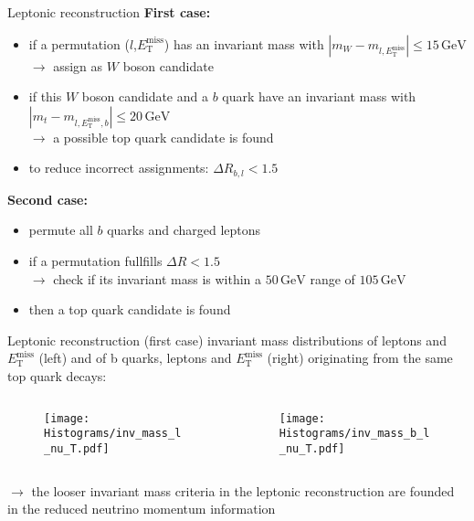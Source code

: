 \documentclass[aspectratio=1610, professionalfonts, 9pt]{beamer}
\begin{document}
\begin{frame}{Leptonic reconstruction}
  \textbf{First case:}
  \begin{itemize}
    \item if a permutation (\(l\),\(E_{\mathrm{T}}^\mathrm{{miss}}\)) has an invariant mass with \(|m_{W}-m_{l,E_{\mathrm{T}}^\mathrm{{miss}}}| \le 15\,\mathrm{GeV}\) \\
    \(\rightarrow\) assign as \(W\) boson candidate
    \item if this \(W\) boson candidate and a \(b\) quark have an invariant mass with \(|m_{t}-m_{l,E_{\mathrm{T}}^\mathrm{{miss}},b}| \le 20\,\mathrm{GeV}\) \\
    \(\rightarrow\) a possible top quark candidate is found
    \item to reduce incorrect assignments: \(\Delta R_{b,l} < 1.5\)
  \end{itemize}
  \vspace{3mm}
  \textbf{Second case:}
  \begin{itemize}
    \item permute all \(b\) quarks and charged leptons
    \item if a permutation fullfills \(\Delta R < 1.5\) \\
    \(\rightarrow\) check if its invariant mass is within a \(50 \, \mathrm{GeV}\) range of \(105 \, \mathrm{GeV}\)
    \item then a top quark candidate is found
  \end{itemize}
\end{frame}

\begin{frame}{Leptonic reconstruction (first case)}
  invariant mass distributions of leptons and \(E_{\mathrm{T}}^\mathrm{{miss}}\) (left) and of b quarks,
  leptons and \(E_{\mathrm{T}}^\mathrm{{miss}}\) (right) originating from the same top quark decays:
    \begin{columns}
        \begin{column}{0.5\textwidth}
            \begin{figure}
                \centering
                \texttt{[image: Histograms/inv\_mass\_l\_nu\_T.pdf]}
                \label{fig:lepto_reco1}
            \end{figure}
        \end{column}
        \begin{column}{0.5\textwidth}
            \begin{figure}
                \centering
                \texttt{[image: Histograms/inv\_mass\_b\_l\_nu\_T.pdf]}
                \label{fig:lepto_reco2}
            \end{figure}
        \end{column}
    \end{columns}
    \(\rightarrow\) the looser invariant mass criteria in the leptonic reconstruction are founded in the reduced neutrino momentum information
\end{frame}
\end{document}
